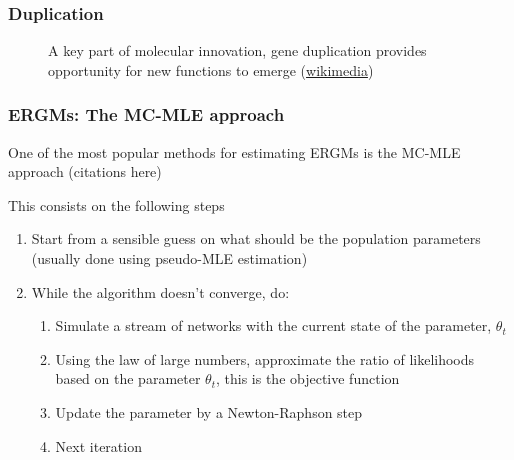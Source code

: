 \documentclass[aspectratio=169, 9pt]{beamer}
\begin{document}
\begin{frame}
\frametitle{Duplication}
\begin{figure}
\centering
\def\svgwidth{.6\linewidth}
\tiny

\caption{A key part of molecular innovation, gene duplication provides opportunity for new functions to emerge (\href{https://en.wikipedia.org/wiki/File:Evolution_fate_duplicate_genes_-_vector.svg}{wikimedia})}
\end{figure}

\vfill\hfill \hyperlink{aphylographicalview}{}

\end{frame}





\begin{frame}[label=mcmle]
\frametitle{ERGMs: The MC-MLE approach}

One of the most popular methods for estimating ERGMs is the MC-MLE approach (citations here)

This consists on the following steps

\begin{enumerate}
\item Start from a sensible guess on what should be the population parameters
(usually done using pseudo-MLE estimation)
\item While the algorithm doesn't converge, do:
  \begin{enumerate}
  \item Simulate a stream of networks with the current state of the parameter,
  $\theta_t$
  \item Using the law of large numbers, approximate the ratio of likelihoods 
  based on the parameter $\theta_t$, this is the objective function
  \item Update the parameter by a Newton-Raphson step
  \item Next iteration
  \end{enumerate}
\end{enumerate}

\vfill\hfill \hyperlink{art}{}


\end{frame}
\end{document}

